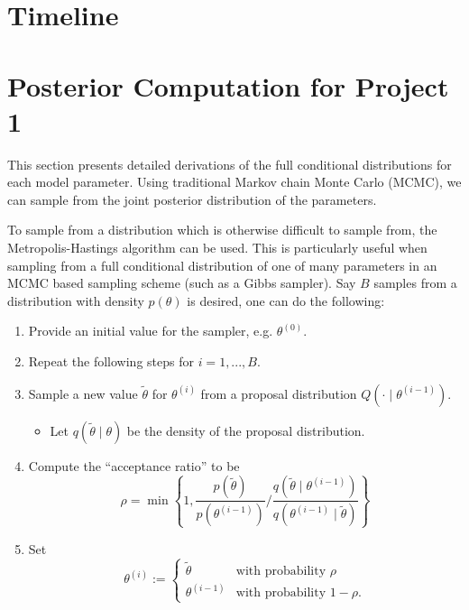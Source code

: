 \documentclass[12pt,]{article}
\providecommand{\tightlist}{%
  \setlength{\itemsep}{0pt}\setlength{\parskip}{0pt}}
\newcommand{\bc}[1]{ \left\{#1\right\} }
\begin{document}
\section{Timeline}\label{sec:time}






\appendix
\section{Posterior Computation for Project 1}
This section presents detailed derivations of the full conditional
distributions for each model parameter. Using traditional Markov
chain Monte Carlo (MCMC), we can sample from the joint posterior 
distribution of the parameters.

To sample from a distribution which is otherwise difficult to sample
from, the Metropolis-Hastings algorithm can be used. This is
particularly useful when sampling from a full conditional distribution
of one of many parameters in an MCMC based sampling scheme (such as a
Gibbs sampler). Say \(B\) samples from a distribution with density
\(p(\theta)\) is desired, one can do the following:

\begin{enumerate}
\def\labelenumi{\arabic{enumi}.}
\tightlist
\item
  Provide an initial value for the sampler, e.g. \(\theta^{(0)}\).
\item
  Repeat the following steps for \(i = 1,...,B\).
\item
  Sample a new value \(\tilde\theta\) for \(\theta^{(i)}\) from a
  proposal distribution \(Q(\cdot \mid \theta^{(i-1)})\).

  \begin{itemize}
  \tightlist
  \item
    Let \(q(\tilde\theta \mid \theta)\) be the density of the proposal
    distribution.
  \end{itemize}
\item
  Compute the ``acceptance ratio'' to be \[
     \rho=
     \min\bc{1, \frac{p(\tilde\theta)}{p(\theta^{(i-1)})} \Big/ 
            \frac{q(\tilde\theta\mid\theta^{(i-1)})}
                 {q(\theta^{(i-1)}\mid\tilde\theta)}
        }
     \]
\item
  Set \[
     \theta^{(i)} := 
     \begin{cases}
     \tilde\theta &\text{with probability } \rho \\
     \theta^{(i-1)} &\text{with probability } 1-\rho.
     \end{cases}
     \]
\end{enumerate}
\end{document}
